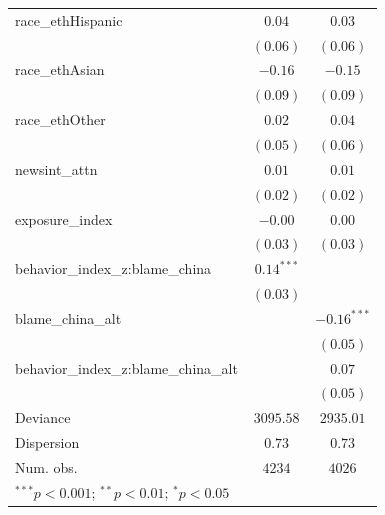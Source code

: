 \begin{tabular}{l c c}
race\_ethHispanic                    & $0.04$        & $0.03$        \\
                                     & $(0.06)$      & $(0.06)$      \\
race\_ethAsian                       & $-0.16$       & $-0.15$       \\
                                     & $(0.09)$      & $(0.09)$      \\
race\_ethOther                       & $0.02$        & $0.04$        \\
                                     & $(0.05)$      & $(0.06)$      \\
newsint\_attn                        & $0.01$        & $0.01$        \\
                                     & $(0.02)$      & $(0.02)$      \\
exposure\_index                      & $-0.00$       & $0.00$        \\
                                     & $(0.03)$      & $(0.03)$      \\
behavior\_index\_z:blame\_china      & $0.14^{***}$  &               \\
                                     & $(0.03)$      &               \\
blame\_china\_alt                    &               & $-0.16^{***}$ \\
                                     &               & $(0.05)$      \\
behavior\_index\_z:blame\_china\_alt &               & $0.07$        \\
                                     &               & $(0.05)$      \\
\hline
\midrule
Deviance                             & $3095.58$     & $2935.01$     \\
Dispersion                           & $0.73$        & $0.73$        \\
Num. obs.                            & $4234$        & $4026$        \\
\bottomrule
\multicolumn{3}{l}{\scriptsize{$^{***}p<0.001$; $^{**}p<0.01$; $^{*}p<0.05$}}
\end{tabular}
